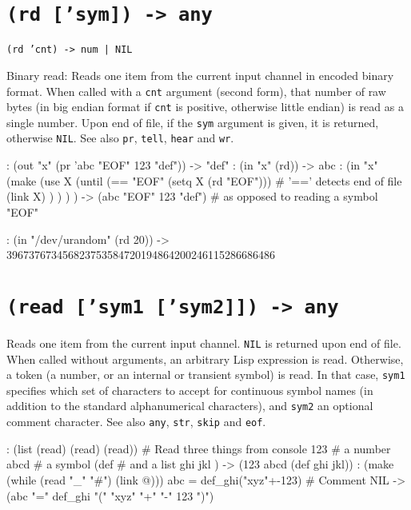  
\section*{\texttt{(rd ['sym]) -> any}}
\label{sec:func-ref-R-(rd ['sym]) -> any}


\texttt{(rd 'cnt) -> num | NIL}

Binary read: Reads one item from the current input channel in encoded
binary format. When called with a \texttt{cnt} argument (second form), that
number of raw bytes (in big endian format if \texttt{cnt} is positive,
otherwise little endian) is read as a single number. Upon end of file,
if the \texttt{sym} argument is given, it is returned, otherwise \texttt{NIL}. See
also \texttt{pr}, \texttt{tell}, \texttt{hear} and \texttt{wr}.


\begin{wideverbatim}
: (out "x" (pr 'abc "EOF" 123 "def"))
-> "def"
: (in "x" (rd))
-> abc
: (in "x"
   (make
      (use X
         (until (== "EOF" (setq X (rd "EOF")))  # '==' detects end of file
            (link X) ) ) ) )
-> (abc "EOF" 123 "def")  # as opposed to reading a symbol "EOF"

: (in "/dev/urandom" (rd 20))
-> 396737673456823753584720194864200246115286686486
\end{wideverbatim}

 
\section*{\texttt{(read ['sym1 ['sym2]]) -> any}}
\label{sec:func-ref-R-(read ['sym1 ['sym2]]) -> any}


Reads one item from the current input channel. \texttt{NIL} is returned upon
end of file. When called without arguments, an arbitrary Lisp expression
is read. Otherwise, a token (a number, or an internal or transient
symbol) is read. In that case, \texttt{sym1} specifies which set of characters
to accept for continuous symbol names (in addition to the standard
alphanumerical characters), and \texttt{sym2} an optional comment character.
See also \texttt{any}, \texttt{str}, \texttt{skip} and \texttt{eof}.


\begin{wideverbatim}
: (list (read) (read) (read))    # Read three things from console
123                              # a number
abcd                             # a symbol
(def                             # and a list
ghi
jkl
)
-> (123 abcd (def ghi jkl))
: (make (while (read "_" "#") (link @)))
abc = def_ghi("xyz"+-123) # Comment
NIL
-> (abc "=" def_ghi "(" "xyz" "+" "-" 123 ")")
\end{wideverbatim}

